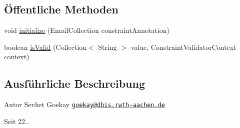 \subsection*{Öffentliche Methoden}
\begin{DoxyCompactItemize}
\item 
void \hyperlink{classde_1_1rwth_1_1idsg_1_1steve_1_1web_1_1validation_1_1_email_collection_validator_a37e7f9ae2ddb91a6c622c9507401d78e}{initialize} (Email\+Collection constraint\+Annotation)
\item 
boolean \hyperlink{classde_1_1rwth_1_1idsg_1_1steve_1_1web_1_1validation_1_1_email_collection_validator_a9ac0f04c5bf929f52e08c9eaaa6c703c}{is\+Valid} (Collection$<$ String $>$ value, Constraint\+Validator\+Context context)
\end{DoxyCompactItemize}


\subsection{Ausführliche Beschreibung}
\begin{DoxyAuthor}{Autor}
Sevket Goekay \href{mailto:goekay@dbis.rwth-aachen.de}{\tt goekay@dbis.\+rwth-\/aachen.\+de} 
\end{DoxyAuthor}
\begin{DoxySince}{Seit}
22.. 
\end{DoxySince}


